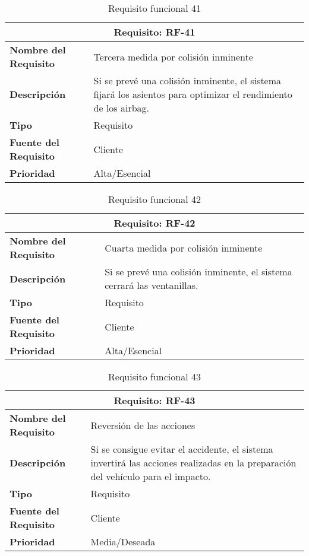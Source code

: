 \begin{table}[H]
\begin{center}
\begin{tabular}{p{} p{7cm}}
\multicolumn{2}{c}{\textbf{Requisito: RF-41} } \\
\hline \hline
\textbf{Nombre del Requisito} & Tercera medida por colisión inminente\\
\hline
\textbf{Descripción} &  Si se prevé una colisión inminente, el sistema fijará los asientos para optimizar el rendimiento de los airbag.\\
\hline
\textbf{Tipo} & Requisito  \\
\hline
\textbf{Fuente del Requisito} & Cliente  \\
\hline
\textbf{Prioridad} & Alta/Esencial \\ \hline
\end{tabular}
\caption{Requisito funcional 41}
\label{tab:RF-41}
\end{center}
\end{table}

\begin{table}[H]
\begin{center}
\begin{tabular}{p{} p{7cm}}
\multicolumn{2}{c}{\textbf{Requisito: RF-42} } \\
\hline \hline
\textbf{Nombre del Requisito} & Cuarta medida por colisión inminente\\
\hline
\textbf{Descripción} &  Si se prevé una colisión inminente, el sistema cerrará las ventanillas.\\
\hline
\textbf{Tipo} & Requisito  \\
\hline
\textbf{Fuente del Requisito} & Cliente  \\
\hline
\textbf{Prioridad} & Alta/Esencial \\ \hline
\end{tabular}
\caption{Requisito funcional 42}
\label{tab:RF-42}
\end{center}
\end{table}

\begin{table}[H]
\begin{center}
\begin{tabular}{p{} p{7cm}}
\multicolumn{2}{c}{\textbf{Requisito: RF-43} } \\
\hline \hline
\textbf{Nombre del Requisito} & Reversión de las acciones\\
\hline
\textbf{Descripción} &  Si se consigue evitar el accidente, el sistema invertirá las acciones realizadas en la preparación del vehículo para el impacto.\\
\hline
\textbf{Tipo} & Requisito  \\
\hline
\textbf{Fuente del Requisito} & Cliente  \\
\hline
\textbf{Prioridad} & Media/Deseada \\ \hline
\end{tabular}
\caption{Requisito funcional 43}
\label{tab:RF-43}
\end{center}
\end{table}



